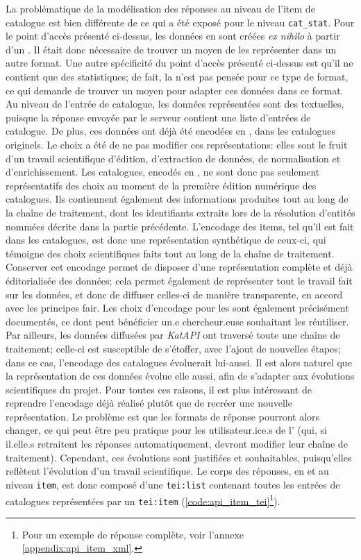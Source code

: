 La problématique de la modélisation des réponses au niveau de l'item de catalogue est bien différente de ce qui a été exposé pour le niveau \texttt{cat\_stat}. Pour le point d'accès présenté ci-dessus, les données en \tei{} sont créées \textit{ex nihilo} à partir d'un \json{}. Il était donc nécessaire de trouver un moyen de les représenter dans un autre format. Une autre spécificité du point d'accès présenté ci-dessus est qu'il ne contient que des statistiques; de fait, la \tei{} n'est pas pensée pour ce type de format, ce qui demande de trouver un moyen pour adapter ces données dans ce format. Au niveau de l'entrée de catalogue, les données représentées sont des textuelles, puisque la réponse envoyée par le serveur contient une liste d'entrées de catalogue. De plus, ces données ont déjà été encodées en \tei{}, dans les catalogues originels. Le choix a été de ne pas modifier ces représentations: elles sont le fruit d'un travail scientifique d'édition, d'extraction de données, de normalisation et d'enrichissement. Les catalogues, encodés en \tei{}, ne sont donc pas seulement représentatifs des choix au moment de la première édition numérique des catalogues. Ils contiennent également des informations produites tout au long de la chaîne de traitement, dont les identifiants \wkd{} extraits lors de la résolution d'entités nommées décrite dans la partie précédente. L'encodage des items, tel qu'il est fait dans les catalogues, est donc une représentation synthétique de ceux-ci, qui témoigne des choix scientifiques faits tout au long de la chaîne de traitement. Conserver cet encodage permet de disposer d'une représentation complète et déjà éditorialisée des données; cela permet également de représenter tout le travail fait sur les données, et donc de diffuser celles-ci de manière transparente, en accord avec les principes \gls{fair}. Les choix d'encodage pour les sont également précisément documentés, ce dont peut bénéficier un.e chercheur.euse souhaitant les réutiliser. Par ailleurs, les données diffusées par \textit{KatAPI} ont traversé toute une chaîne de traitement; celle-ci est susceptible de s'étoffer, avec l'ajout de nouvelles étapes; dans ce cas, l'encodage des catalogues évoluerait lui-aussi. Il est alors naturel que la représentation de ces données évolue elle aussi, afin de s'adapter aux évolutions scientifiques du projet. Pour toutes ces raisons, il est plus intéressant de reprendre l'encodage déjà réalisé plutôt que de recréer une nouvelle représentation. Le problème est que les formats de réponse pourront alors changer, ce qui peut être peu pratique pour les utilisateur.ice.s de l'\api{} (qui, si il.elle.s retraitent les réponses automatiquement, devront modifier leur chaîne de traitement). Cependant, ces évolutions sont justifiées et souhaitables, puisqu'elles reflètent l'évolution d'un travail scientifique. Le corps des réponses, en \tei{} et au niveau \texttt{item}, est donc composé d'une \texttt{tei:list} contenant toutes les entrées de catalogues représentées par un \texttt{tei:item} (\ref{code:api_item_tei}\footnote{
	Pour un exemple de réponse complète, voir l'annexe \ref{appendix:api_item_xml}.
}).

